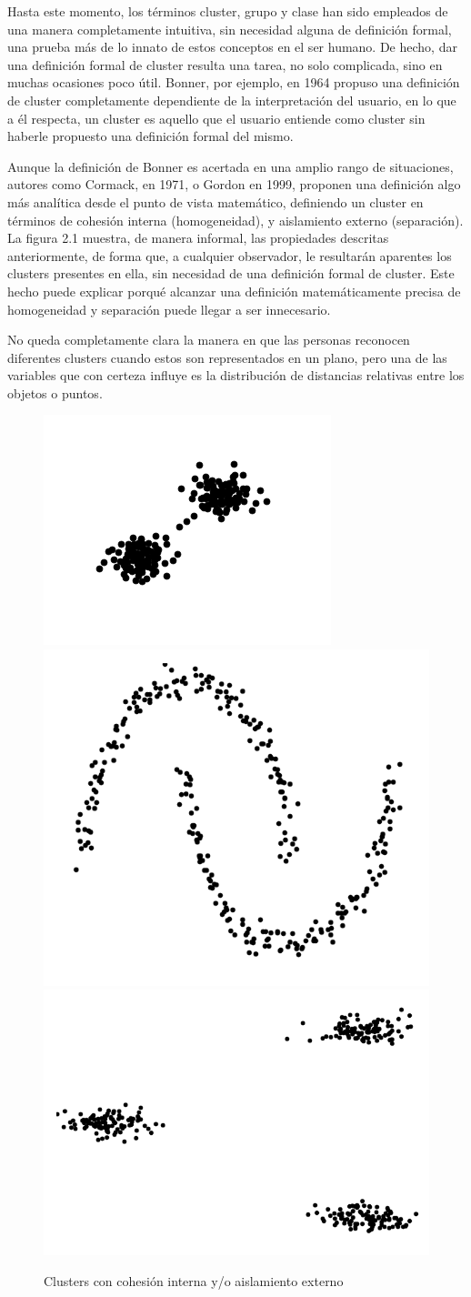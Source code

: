 Hasta este momento, los términos cluster, grupo y clase han sido empleados de una manera completamente intuitiva, sin necesidad alguna de definición formal, una prueba más de lo innato de estos conceptos en el ser humano. De hecho, dar una definición formal de cluster resulta una tarea, no solo complicada, sino en muchas ocasiones poco útil. Bonner, por ejemplo, en 1964 propuso una definición de cluster completamente dependiente de la interpretación del usuario, en lo que a él respecta, un cluster es aquello que el usuario entiende como cluster sin haberle propuesto una definición formal del mismo.

Aunque la definición de Bonner es acertada en una amplio rango de situaciones, autores como Cormack, en 1971, o Gordon en 1999, proponen una definición algo más analítica desde el punto de vista matemático, definiendo un cluster en términos de cohesión interna (homogeneidad), y aislamiento externo (separación). La figura 2.1 muestra, de manera informal, las propiedades descritas anteriormente, de forma que, a cualquier observador, le resultarán aparentes los clusters presentes en ella, sin necesidad de una definición formal de cluster. Este hecho puede explicar porqué alcanzar una definición matemáticamente precisa de homogeneidad y separación puede llegar a ser innecesario.

No queda completamente clara la manera en que las personas reconocen diferentes clusters cuando estos son representados en un plano, pero una de las variables que con certeza influye es la distribución de distancias relativas entre los objetos o puntos.

\clearpage

\begin{figure}[bth]
	\myfloatalign
	{\includegraphics[width=.3\linewidth]{imagenes/c2/TwoBasicsClusters}}
	{\includegraphics[width=.3\linewidth]{imagenes/c2/MoonsBasics}}
	{\includegraphics[width=.3\linewidth]{imagenes/c2/ThreeBasicClusters}}
	\caption[Clusters con cohesión interna y/o aislamiento externo]{Clusters con cohesión interna y/o aislamiento externo}\label{fig:figure1}
\end{figure}

